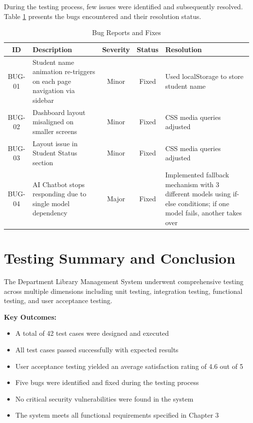 \documentclass[12pt,a4paper]{report}
\begin{document}
During the testing process, few issues were identified and subsequently resolved. Table \ref{tab:bugs} presents the bugs encountered and their resolution status.

\vspace{0.3cm}

\begin{table}[h]
\centering
\small
\begin{tabularx}{\textwidth}{|c|X|c|c|X|}
\hline
\textbf{ID} & \textbf{Description} & \textbf{Severity} & \textbf{Status} & \textbf{Resolution} \\
\hline
BUG-01 & Student name animation re-triggers on each page navigation via sidebar & Minor & Fixed & Used localStorage to store student name \\
\hline
BUG-02 & Dashboard layout misaligned on smaller screens & Minor & Fixed & CSS media queries adjusted \\
\hline
BUG-03 & Layout issue in Student Status section & Minor & Fixed & CSS media queries adjusted \\
\hline
BUG-04 & AI Chatbot stops responding due to single model dependency & Major & Fixed & Implemented fallback mechanism with 3 different models using if-else conditions; if one model fails, another takes over \\
\hline
\end{tabularx}
\caption{Bug Reports and Fixes}
\label{tab:bugs}
\end{table}

\newpage

\section{Testing Summary and Conclusion}

The Department Library Management System underwent comprehensive testing across multiple dimensions including unit testing, integration testing, functional testing, and user acceptance testing.

\textbf{Key Outcomes:}

\begin{itemize}
    \item A total of 42 test cases were designed and executed
    \item All test cases passed successfully with expected results
    \item User acceptance testing yielded an average satisfaction rating of 4.6 out of 5
    \item Five bugs were identified and fixed during the testing process
    \item No critical security vulnerabilities were found in the system
    \item The system meets all functional requirements specified in Chapter 3
\end{itemize}
\end{document}
